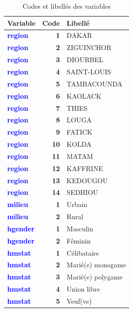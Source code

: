 \documentclass[
]{article}
\begin{document}
\begin{longtable}[t]{>{}l>{}r>{\raggedright\arraybackslash}p{8cm}}
\caption{\label{tab:recodage-harmonisation-2}Codes et libellés des variables}\\
\toprule
Variable & Code & Libellé\\
\midrule
\textcolor{blue}{\textbf{region}} & \textbf{1} & DAKAR\\
\textcolor{blue}{\textbf{region}} & \textbf{2} & ZIGUINCHOR\\
\textcolor{blue}{\textbf{region}} & \textbf{3} & DIOURBEL\\
\textcolor{blue}{\textbf{region}} & \textbf{4} & SAINT-LOUIS\\
\textcolor{blue}{\textbf{region}} & \textbf{5} & TAMBACOUNDA\\
\addlinespace
\textcolor{blue}{\textbf{region}} & \textbf{6} & KAOLACK\\
\textcolor{blue}{\textbf{region}} & \textbf{7} & THIES\\
\textcolor{blue}{\textbf{region}} & \textbf{8} & LOUGA\\
\textcolor{blue}{\textbf{region}} & \textbf{9} & FATICK\\
\textcolor{blue}{\textbf{region}} & \textbf{10} & KOLDA\\
\addlinespace
\textcolor{blue}{\textbf{region}} & \textbf{11} & MATAM\\
\textcolor{blue}{\textbf{region}} & \textbf{12} & KAFFRINE\\
\textcolor{blue}{\textbf{region}} & \textbf{13} & KEDOUGOU\\
\textcolor{blue}{\textbf{region}} & \textbf{14} & SEDHIOU\\
\textcolor{blue}{\textbf{milieu}} & \textbf{1} & Urbain\\
\addlinespace
\textcolor{blue}{\textbf{milieu}} & \textbf{2} & Rural\\
\textcolor{blue}{\textbf{hgender}} & \textbf{1} & Masculin\\
\textcolor{blue}{\textbf{hgender}} & \textbf{2} & Féminin\\
\textcolor{blue}{\textbf{hmstat}} & \textbf{1} & Célibataire\\
\textcolor{blue}{\textbf{hmstat}} & \textbf{2} & Marié(e) monogame\\
\addlinespace
\textcolor{blue}{\textbf{hmstat}} & \textbf{3} & Marié(e) polygame\\
\textcolor{blue}{\textbf{hmstat}} & \textbf{4} & Union libre\\
\textcolor{blue}{\textbf{hmstat}} & \textbf{5} & Veuf(ve)\\

\end{longtable}
\end{document}
